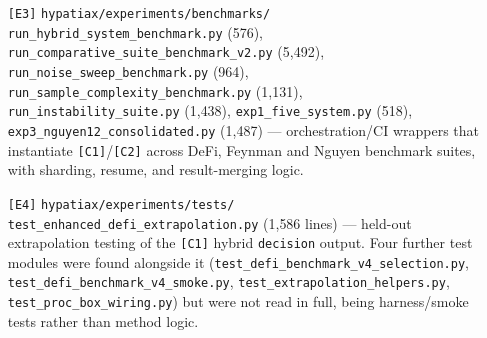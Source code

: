 \documentclass[11pt,a4paper]{article}
\newcommand{\code}[1]{\texttt{\small #1}}
\begin{document}
\begin{itemize}[leftmargin=1.4cm]
        (1{,}771 lines) --- ablation of the LLM-prior contribution
        (\S10.6/\S10.9 of the paper); dynamically loads its driving engine
        from \code{tools/symbolic/hybrid\_system\_v50\_2.py} \code{[T1]}
        (see the version-drift note in \S4).
  \item[\code{[E3]}] \code{hypatiax/experiments/benchmarks/}\\
        \code{run\_hybrid\_system\_benchmark.py} (576),
        \code{run\_comparative\_suite\_benchmark\_v2.py} (5{,}492), \\
        \code{run\_noise\_sweep\_benchmark.py} (964),
        \code{run\_sample\_complexity\_benchmark.py} (1{,}131), \\
        \code{run\_instability\_suite.py} (1{,}438),
        \code{exp1\_five\_system.py} (518),
        \code{exp3\_nguyen12\_consolidated.py} (1{,}487) --- orchestration/CI
        wrappers that instantiate \code{[C1]}/\code{[C2]} across DeFi,
        Feynman and Nguyen benchmark suites, with sharding, resume, and
        result-merging logic.
  \item[\code{[E4]}] \code{hypatiax/experiments/tests/}\\
        \code{test\_enhanced\_defi\_extrapolation.py} (1{,}586 lines) ---
        held-out extrapolation testing of the \code{[C1]} hybrid
        \code{decision} output. Four further test modules were found
        alongside it (\code{test\_defi\_benchmark\_v4\_selection.py},
        \code{test\_defi\_benchmark\_v4\_smoke.py},
        \code{test\_extrapolation\_helpers.py},
        \code{test\_proc\_box\_wiring.py}) but were not read in full, being
        harness/smoke tests rather than method logic.
\end{itemize}
\end{document}
